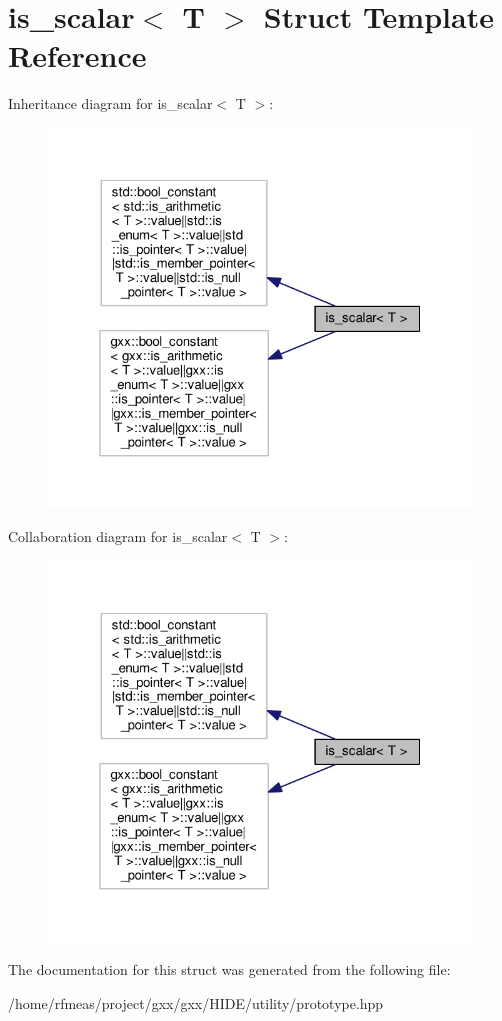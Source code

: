 \hypertarget{structis__scalar}{}\section{is\+\_\+scalar$<$ T $>$ Struct Template Reference}
\label{structis__scalar}


Inheritance diagram for is\+\_\+scalar$<$ T $>$\+:
\nopagebreak
\begin{figure}[H]
\begin{center}
\leavevmode
\includegraphics[width=325pt]{structis__scalar__inherit__graph}
\end{center}
\end{figure}


Collaboration diagram for is\+\_\+scalar$<$ T $>$\+:
\nopagebreak
\begin{figure}[H]
\begin{center}
\leavevmode
\includegraphics[width=325pt]{structis__scalar__coll__graph}
\end{center}
\end{figure}


The documentation for this struct was generated from the following file\+:\begin{DoxyCompactItemize}
\item 
/home/rfmeas/project/gxx/gxx/\+H\+I\+D\+E/utility/prototype.\+hpp\end{DoxyCompactItemize}
